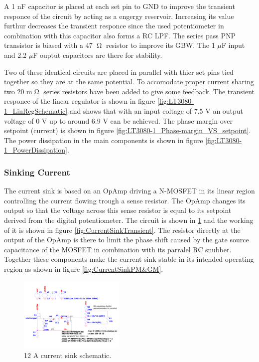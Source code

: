 A 1 nF capacitor is placed at each set pin to GND to improve the transient responce of the circuit by acting as a engergy reservoir. Increasing its value furthur decreases the transient responce since the used potentiometer in combination with this capacitor also forms a RC LPF. The series pass PNP transistor is biased with a 47 $\tcohm$ resistor to improve its GBW. The 1 $\mu$F input and 2.2 $\mu$F ouptut capacitors are there for stability.

Two of these identical circuits are placed in parallel with thier set pins tied together so they are at the same potential. To accomodate proper current sharing two 20 m$\tcohm$ series resistors have been added to give some feedback.
The transient responce of the linear regulator is shown in figure \ref{fig:LT3080-1_LinRegSchematic} and shows that with an input coltage of 7.5 V an output voltage of 0 V up to around 6.9 V can be achieved. The phase margin over setpoint (current) is shown in figure \ref{fig:LT3080-1_Phase-margin_VS_setpoint}. The power dissipation in the main components is shown in figure \ref{fig:LT3080-1_PowerDissipation}.

\subsubsection{Sinking Current}
The current sink is based on an OpAmp driving a N-MOSFET in its linear region controlling the current flowing trough a sense resistor. The OpAmp changes its output so that the voltage across this sense resistor is equal to its setpoint derived from the digital potentiometer. The circuit is shown in \ref{fig:CurrentSinkSchematic} and the working of it is shown in figure \ref{fig:CurrentSinkTransient}. The resistor directly at the output of the OpAmp is there to limit the phase shift caused by the gate source capacitance of the MOSFET in combination with its parralel RC snubber. Together these components make the current sink stable in its intended operating region as shown in figure \ref{fig:CurrentSinkPM&GM}.

\begin{figure}[h!]
    \centering
    \includegraphics[width=0.45\textwidth]{CurrentSinkSchematic.pdf}
    \caption{12 A current sink schematic.}
    \label{fig:CurrentSinkSchematic}
\end{figure}

